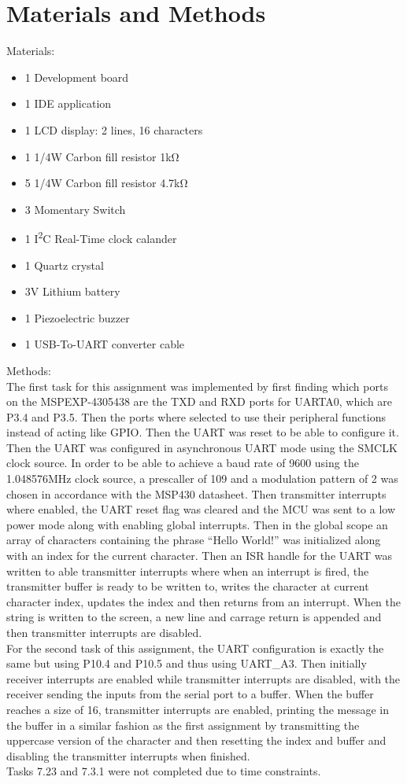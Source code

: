 \documentclass[journal]{IEEEtran}
\begin{document}
\section{Materials and Methods}
Materials:
\begin{itemize}
  \item 1 Development board
  \item 1 IDE application
  \item 1 LCD display: 2 lines, 16 characters
  \item 1 1/4\si{\watt} Carbon fill resistor 1\si{\kilo\ohm}
  \item 5 1/4\si{\watt} Carbon fill resistor 4.7\si{\kilo\ohm}
  \item 3 Momentary Switch
  \item 1 I\textsuperscript{2}C Real-Time clock calander
  \item 1 Quartz crystal
  \item 3\si{\volt} Lithium battery
  \item 1 Piezoelectric buzzer
  \item 1 USB-To-UART converter cable
\end{itemize}
Methods:\\
The first task for this assignment was implemented by first finding which ports on the MSPEXP-4305438 are the TXD and RXD ports for UARTA0, which are P3.4 and P3.5. Then the ports where selected to use their peripheral functions instead of acting like GPIO. Then the UART was reset to be able to configure it. Then the UART was configured in asynchronous UART mode using the SMCLK clock source. In order to be able to achieve a baud rate of 9600 using the 1.048576\si{\mega\hertz} clock source, a prescaller of 109 and a modulation pattern of 2 was chosen in accordance with the MSP430 datasheet. Then transmitter interrupts where enabled, the UART reset flag was cleared and the MCU was sent to a low power mode along with enabling global interrupts. Then in the global scope an array of characters containing the phrase ``Hello World!''  was initialized along with an index for the current character. Then an ISR handle for the UART was written to able transmitter interrupts where when an interrupt is fired, the transmitter buffer is ready to be written to, writes the character at current character index, updates the index and then returns from an interrupt. When the string is written to the screen, a new line and carrage return is appended and then transmitter interrupts are disabled.\\
For the second task of this assignment, the UART configuration is exactly the same but using P10.4 and P10.5 and thus using UART\_A3. Then initially receiver interrupts are enabled while transmitter interrupts are disabled, with the receiver sending the inputs from the serial port to a buffer. When the buffer reaches a size of 16, transmitter interrupts are enabled, printing the message in the buffer in a similar fashion as the first assignment by transmitting the uppercase version of the character and then resetting the index and buffer and disabling the transmitter interrupts when finished.\\
Tasks 7.23 and 7.3.1 were not completed due to time constraints.
\end{document}
